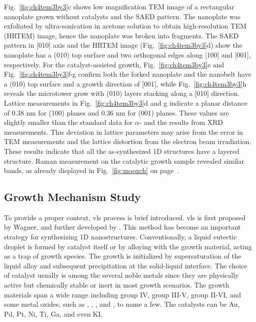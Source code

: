 Fig.~\ref{fig:ch4tem3by3}c shows low magnification TEM image of a rectangular nanoplate grown without catalysts and the SAED pattern. The nanoplate was exfoliated by ultra-sonication in acetone solution to obtain high-resolution TEM (HRTEM) image, hence the nanoplate was broken into fragments. The SAED pattern in [010] axis and the HRTEM image (Fig.~\ref{fig:ch4tem3by3}d) show the nanoplate has a (010) top surface and two orthogonal edges along [100] and [001], respectively. For the catalyst-assisted growth, Fig.~\ref{fig:ch4tem3by3}e and Fig.~\ref{fig:ch4tem3by3}f-g confirm both the forked nanoplate and the nanobelt have a (010) top surface and a growth direction of [001], while Fig.~\ref{fig:ch4tem3by3}h reveals the microtower grow with (010) layers stacking along a [010] direction. Lattice measurements in Fig.~\ref{fig:ch4tem3by3}d and g indicate a planar distance of 0.38 nm for (100) planes and 0.36 nm for (001) planes. These values are slightly smaller than the standard data for $\alpha$- and the results from XRD measurements. This deviation in lattice parameters may arise from the error in TEM measurements and the lattice distortion from the electron beam irradiation.\cite{Wang2004b} These results indicate that all the as-synthesized 1D structures have a layered structure. Raman measurement on the catalytic growth sample revealed similar  bands, as already displayed in Fig.~\ref{fig:mooxch} on page~\pageref{fig:mooxch}. 

\subsection{Growth Mechanism Study}\label{sec:nasi}

To provide a proper context, \gls{vls} process is brief introduced. \gls{vls} is first proposed by Wagner,\cite{Wagner1964} and further developed by \citeauthor{Givargizov1975}.\cite{Givargizov1975} This method has become an important strategy for synthesizing 1D nanostructures.\cite{Lieber1998} Conventionally, a liquid eutectic droplet is formed by catalyst itself or by alloying with the growth material, acting as a trap of growth species. The growth is initialized by supersaturation of the liquid alloy and subsequent precipitation at the solid-liquid interface. The choice of catalyst usually is among the several noble metals since they are physically active but chemically stable or inert in most growth scenarios. The growth materials span a wide range including group IV,\cite{Hochbaum2005} group III-V,\citep{Dalacu2013, Xiao2012, Dubrovskii2011} group II-VI,\cite{Hao2006} and some metal oxides, such as ,\citep{Huang2001a,Ramgir2010} ,\citep{HEUER1967, Nagashima2007} ,\cite{Pan2002} and ,\cite{Zhuge2012} to name a few. The catalysts can be Au, Pd, Pt, Ni,\cite{Xiao2012} Ti, Ga,\cite{Pan2002} and even KI.

